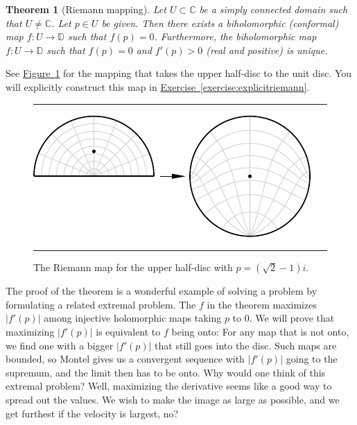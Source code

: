\documentclass[12pt,openany]{book}
\newcommand{\sabs}[1]{\lvert {#1} \rvert}
\newcommand{\C}{{\mathbb{C}}}
\newcommand{\D}{{\mathbb{D}}}
\theoremstyle{plain}
\newtheorem{thm}{Theorem}[section]
\theoremstyle{remark}
\theoremstyle{definition}
\newenvironment{myfig}{%
\begin{figure}[h!t]
\noindent\rule{\textwidth}{0.5pt}\vspace{12pt}\par\centering}%
{\par\noindent\rule{\textwidth}{0.5pt}
\end{figure}}
\theoremstyle{exercise}
\theoremstyle{example}
\newcommand{\figureref}[1]{\hyperref[#1]{Figure~\ref*{#1}}}
\newcommand{\exerciseref}[1]{\hyperref[#1]{Exercise~\ref*{#1}}}
\begin{document}
\begin{thm}[Riemann mapping]\label{thm:RMT}
Let $U \subset \C$ be a simply connected domain such that $U \not= \C$.
Let $p \in U$ be given.  Then there exists a biholomorphic (conformal)
map $f \colon U \to \D$ such that $f(p) = 0$.
Furthermore, the biholomorphic map $f \colon U \to \D$
such that $f(p) = 0$ and
$f'(p) > 0$ (real and positive) is unique.
\end{thm}

See \figureref{fig:riemannmap} for the mapping that takes the
upper half-disc to the unit disc.  You will explicitly construct this map in
\exerciseref{exercise:explicitriemann}.

\begin{myfig}
\includegraphics{figures/riemannmap}
\caption{The Riemann map for the upper half-disc with $p=(\sqrt{2}-1)i$.%
\label{fig:riemannmap}}
\end{myfig}

The proof of the theorem is a wonderful example of solving
a problem by formulating a related extremal problem.  The $f$
in the theorem maximizes
$\sabs{f'(p)}$ among injective holomorphic maps taking $p$ to 0.
We will prove that maximizing $\sabs{f'(p)}$ is equivalent to $f$ being
onto:
For any map that is not onto, we find one with a bigger
$\sabs{f'(p)}$ that still goes into the disc.  Such maps are bounded,
so Montel gives us a convergent sequence with $\sabs{f'(p)}$
going to the supremum, and the limit then has to be onto.
Why would one think of this extremal problem?  Well,
maximizing the derivative seems like a good way to spread out the values.
We wish to make the image as large as possible, and we get furthest if the
velocity is largest, no?
\end{document}
